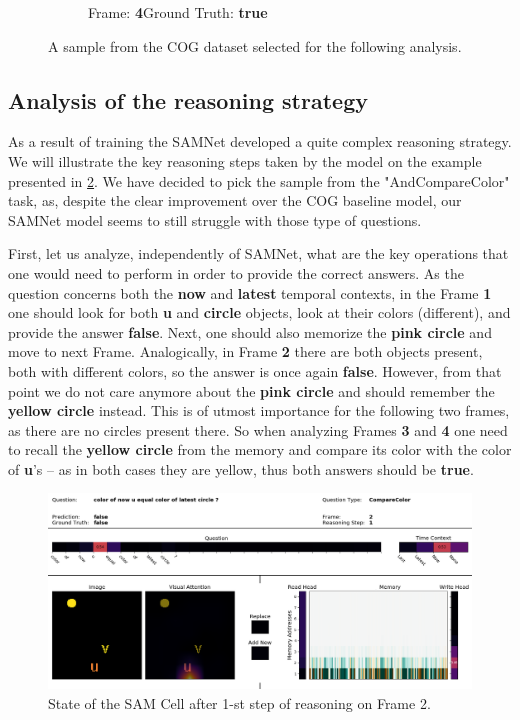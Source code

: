 \begin{figure}[!b]
\begin{subfigure}{0.25\textwidth}
	\caption{Frame: \textbf{4}\newline Ground Truth: \textbf{true}}
	\label{fig:frame-4}
  \end{subfigure}%
  \hfill\null
  \newline
  \centering
\caption{A sample from the COG dataset selected for the following analysis.} 
\label{fig:example}  
\end{figure}

\subsection{Analysis of the reasoning strategy}
As a result of training the SAMNet developed a quite complex reasoning strategy.
We will illustrate the key reasoning steps taken by the model on the example presented in \cref{fig:example}.
We have decided to pick the sample from the "AndCompareColor" task, as, despite the clear improvement over the COG baseline model, our SAMNet model seems to still struggle with those type of questions.	

First, let us analyze, independently of SAMNet, what are the key operations that one would need to perform in order to provide the correct answers. 
As the question concerns both the \textbf{now} and \textbf{latest} temporal contexts, in the Frame \textbf{1} one should look for both \textbf{u} and \textbf{circle} objects, look at their colors (different), and provide the answer \textbf{false}.
Next, one should also memorize the \textbf{pink circle} and move to next Frame.
Analogically, in Frame \textbf{2} there are both objects present, both with different colors, so the answer is once again \textbf{false}.
However, from that point we do not care anymore about the \textbf{pink circle} and should remember the \textbf{yellow circle} instead.
This is of utmost importance for the following two frames, as there are no circles present there.
So when analyzing Frames \textbf{3} and \textbf{4} one need to recall the \textbf{yellow circle} from the memory and compare its color with the color of \textbf{u}'s -- as in both cases they are yellow, thus  both answers should be \textbf{true}.

\begin{figure}[!h]
	\centering
	\includegraphics[width=\textwidth]{"../img/visualization/sample 2/Frame 2 Step 1"}
	\caption{State of the SAM Cell after 1-st step of reasoning on Frame 2.} 
	\label{fig:frame-2-step-1}
\end{figure}

